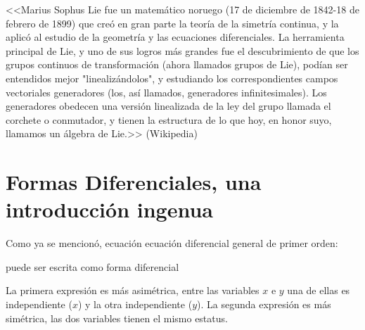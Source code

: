 \documentclass{article}
\renewcommand{\emph}[1]{\textcolor[rgb]{1,0,0}{#1}}
\begin{document}
<<Marius Sophus Lie fue un matemático noruego (17 de diciembre de 1842-18 de febrero de 1899) que creó en gran parte la teoría de la simetría continua, y la aplicó al estudio de la geometría y las ecuaciones diferenciales.
La herramienta principal de Lie, y uno de sus logros más grandes fue el descubrimiento de que los grupos continuos de transformación (ahora llamados grupos de Lie), podían ser
 entendidos mejor "linealizándolos", y estudiando los correspondientes campos vectoriales generadores (los, así llamados, generadores infinitesimales).
Los generadores obedecen una versión linealizada de la ley del grupo llamada el corchete o conmutador, y tienen la estructura de lo que hoy, en honor suyo, llamamos un álgebra de Lie.>> (Wikipedia)





\section{Formas Diferenciales, una introducción ingenua}

Como ya se mencionó, ecuación ecuación diferencial general de primer orden:

puede ser escrita como \emph{forma diferencial}

 La primera expresión es más asimétrica, entre las variables $x$ e $y$ una de ellas es independiente ($x$) y la otra independiente  ($y$).  La segunda expresión es  más simétrica, las dos variables tienen el mismo estatus.
\end{document}
